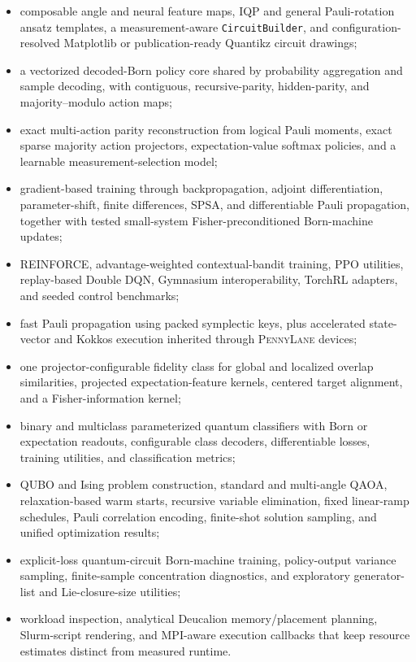 \documentclass[10pt]{article}
\newcommand{\pennylane}{\textsc{PennyLane}}
\newcommand{\code}[1]{\texttt{#1}}
\begin{document}
\begin{itemize}
  \item composable angle and neural feature maps, IQP and general Pauli-rotation ansatz templates, a measurement-aware \code{CircuitBuilder}, and configuration-resolved Matplotlib or publication-ready Quantikz circuit drawings;
  \item a vectorized decoded-Born policy core shared by probability aggregation
        and sample decoding, with contiguous, recursive-parity, hidden-parity,
        and majority--modulo action maps;
  \item exact multi-action parity reconstruction from logical Pauli moments,
        exact sparse majority action projectors, expectation-value softmax
        policies, and a learnable measurement-selection model;
  \item gradient-based training through backpropagation, adjoint differentiation,
        parameter-shift, finite differences, SPSA, and differentiable Pauli
        propagation, together with tested small-system Fisher-preconditioned
        Born-machine updates;
  \item REINFORCE, advantage-weighted contextual-bandit training, PPO
        utilities, replay-based Double DQN, Gymnasium interoperability,
        TorchRL adapters, and seeded control benchmarks;
  \item fast Pauli propagation using packed symplectic keys, plus accelerated state-vector and Kokkos execution inherited through \pennylane{} devices;
  \item one projector-configurable fidelity class for global and localized
        overlap similarities, projected expectation-feature kernels, centered
        target alignment, and a Fisher-information kernel;
  \item binary and multiclass parameterized quantum classifiers with Born or
        expectation readouts, configurable class decoders, differentiable
        losses, training utilities, and classification metrics;
  \item QUBO and Ising problem construction, standard and multi-angle QAOA,
        relaxation-based warm starts, recursive variable elimination,
        fixed linear-ramp schedules, Pauli correlation encoding, finite-shot
        solution sampling, and unified optimization results;
  \item explicit-loss quantum-circuit Born-machine training, policy-output
        variance sampling, finite-sample concentration diagnostics, and
        exploratory generator-list and Lie-closure-size utilities;
  \item workload inspection, analytical Deucalion memory/placement planning,
        Slurm-script rendering, and MPI-aware execution callbacks that keep
        resource estimates distinct from measured runtime.
\end{itemize}
\end{document}
